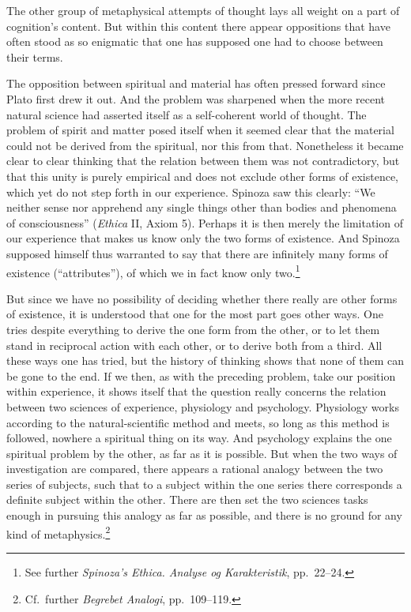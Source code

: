 \documentclass[12pt]{book}
\newcommand{\opage}[1]{\marginnote{\footnotesize\textit{[#1]}}}
\begin{document}
\opage{90}The other group of metaphysical attempts of thought lays all weight on a part of cognition's content. But
within this content there appear oppositions that have often stood as so enigmatic that one has supposed one
had to choose between their terms.

The opposition between spiritual and material has often pressed forward since Plato first drew it out. And the
problem was sharpened when the more recent natural science had asserted itself as a self-coherent world of
thought. The problem of spirit and matter posed itself when it seemed clear that the material could not be
derived from the spiritual, nor this from that. Nonetheless it became clear to clear thinking that the relation
between them was not contradictory, but that this unity is purely empirical and does not exclude other forms of
existence, which yet do not step forth in our experience. Spinoza saw this clearly: ``We neither sense nor
apprehend any single things other than bodies and phenomena of consciousness'' (\textit{Ethica} II, Axiom 5).
Perhaps it is then merely the limitation of our experience that makes us know only the two forms of existence.
And Spinoza supposed himself thus warranted to say that there are infinitely many forms of existence
(``attributes''), of which we in fact know only two.\footnote{See further \textit{Spinoza's Ethica. Analyse og
Karakteristik}, pp.\ 22--24.}

But since we have no possibility of deciding whether there really are other forms of existence, it is understood
that one for the most part goes other ways. One tries despite everything to derive the one form from the other,
or to let them stand in reciprocal action with each other, or to derive both from a third. All these ways one
has tried, but the history of thinking shows that none of them can be gone to the end. If we then, as with the
preceding problem, take our position within experience, it shows itself that the question really \opage{91}concerns the
relation between two sciences of experience, physiology and psychology. Physiology works according to the
natural-scientific method and meets, so long as this method is followed, nowhere a spiritual thing on its way.
And psychology explains the one spiritual problem by the other, as far as it is possible. But when the two ways
of investigation are compared, there appears a rational analogy between the two series of subjects, such that to
a subject within the one series there corresponds a definite subject within the other. There are then set the
two sciences tasks enough in pursuing this analogy as far as possible, and there is no ground for any kind of
metaphysics.\footnote{Cf.\ further \textit{Begrebet Analogi}, pp.\ 109--119.}
\end{document}
